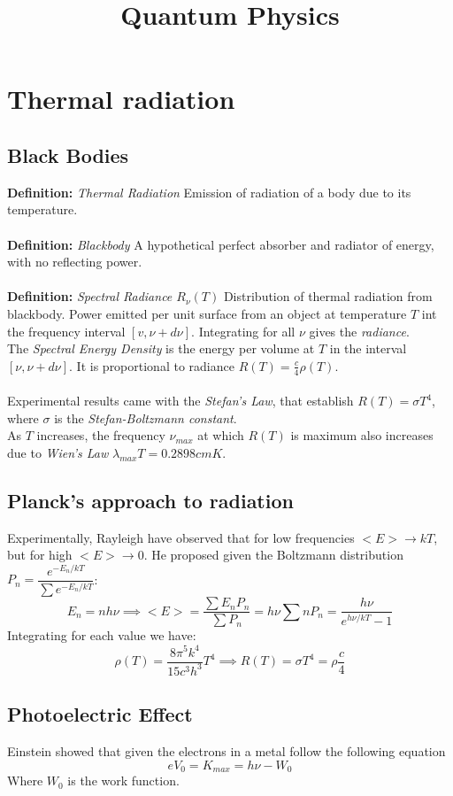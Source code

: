 \documentclass{myclass}
\title{Quantum Physics}
\newcommand{\defi}[1]{\textbf{Definition:} \textit{#1}}
\begin{document}
\watermark
\maketitle
\tableofcontents
\newpage

\section{Thermal radiation}
\subsection{Black Bodies}
\defi{Thermal Radiation} Emission of radiation of a body due to its temperature. \\
\\
\defi{Blackbody} A hypothetical perfect absorber and radiator of energy, with no reflecting power.\\
\\
\defi{Spectral Radiance $R_\nu(T)$} Distribution of thermal radiation from blackbody. Power emitted per unit surface from an object at temperature $T$ int the frequency interval $[v, \nu + d\nu]$. Integrating for all $\nu$ gives the \textit{radiance}. \\
The \textit{Spectral Energy Density} is the energy per volume at $T$ in the interval $[\nu, \nu + d\nu]$. It is proportional to radiance $R(T)=\frac{c}{4}\rho(T)$. \\
\\
Experimental results came with the \textit{Stefan's Law}, that establish $R(T)=\sigma T^4$, where $\sigma$ is the \textit{Stefan-Boltzmann constant}. \\ As $T$ increases, the frequency $\nu_{max}$ at which $R(T)$ is maximum also increases due to \textit{Wien's Law} $\lambda_{max}T=0.2898 cmK$.

\subsection{Planck's approach to radiation}
Experimentally, Rayleigh have observed that for low frequencies $<E>\to kT$, but for high $<E>\to 0$. He proposed given the Boltzmann distribution $P_n=\dfrac{e^{-E_n/kT}}{\sum e^{-E_n/kT}}$:
$$
E_n=nh\nu \implies <E>=\frac{\sum E_nP_n}{\sum P_n}=h\nu\sum nP_n = \frac{h\nu}{e^{h\nu/kT}-1}
$$
Integrating for each value we have:
$$\rho(T)=\frac{8\pi^5k^4}{15c^3h^3}T^4 \implies R(T)=\sigma T^4 =\rho \frac{c}{4} $$

\subsection{Photoelectric Effect}
Einstein showed that given the electrons in a metal follow the following equation
$$
eV_0=K_{max} = h\nu -W_0
$$
Where $W_0$ is the work function.
\end{document}

